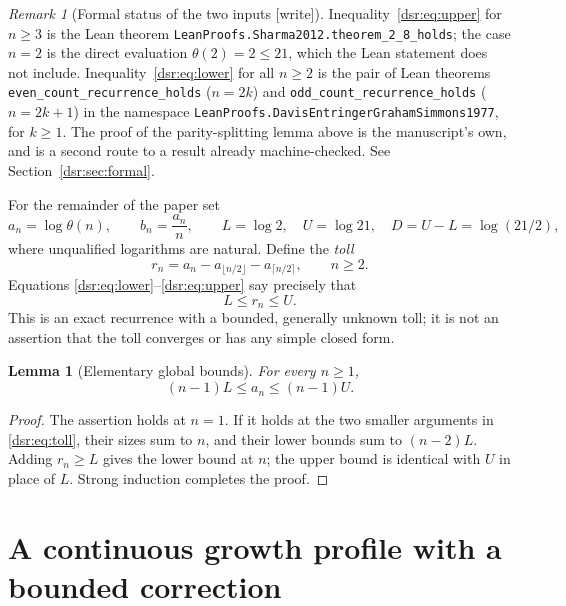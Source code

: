 \documentclass[11pt,a4paper]{article}
\numberwithin{equation}{section}
\newtheorem{lemma}[theorem]{Lemma}
\theoremstyle{definition}
\theoremstyle{remark}
\newtheorem{remark}[theorem]{Remark}
\newcommand{\wtag}{\textup{[write]}}
\newcommand{\lean}[1]{\nolinkurl{#1}}
\theoremstyle{definition}
\theoremstyle{plain}
\begin{document}
\begin{remark}[Formal status of the two inputs \wtag]
\label{dsr:rem:inputs-formal}
Inequality~\eqref{dsr:eq:upper} for $n\ge3$ is the Lean theorem
\lean{LeanProofs.Sharma2012.theorem_2_8_holds}; the case $n=2$ is the direct
evaluation $\theta(2)=2\le21$, which the Lean statement does not include.
Inequality~\eqref{dsr:eq:lower} for all $n\ge2$ is the pair of Lean theorems
\lean{even_count_recurrence_holds} ($n=2k$) and
\lean{odd_count_recurrence_holds} ($n=2k+1$) in the namespace
\lean{LeanProofs.DavisEntringerGrahamSimmons1977}, for $k\ge1$. The proof of
the parity-splitting lemma above is the manuscript's own, and is a second
route to a result already machine-checked. See
Section~\ref{dsr:sec:formal}.
\end{remark}

For the remainder of the paper set
\begin{equation}
 a_n=\log\theta(n),\qquad b_n=\frac{a_n}{n},\qquad
 L=\log2,\quad U=\log21,\quad D=U-L=\log(21/2),
\label{dsr:eq:notation}
\end{equation}
where unqualified logarithms are natural. Define the \emph{toll}
\begin{equation}
 r_n=a_n-a_{\lfloor n/2\rfloor}-a_{\lceil n/2\rceil},\qquad n\ge2.
\label{dsr:eq:toll}
\end{equation}
Equations \eqref{dsr:eq:lower}--\eqref{dsr:eq:upper} say precisely that
\begin{equation}
 L\le r_n\le U. \label{dsr:eq:bounded-toll}
\end{equation}
This is an exact recurrence with a bounded, generally unknown toll; it is not
an assertion that the toll converges or has any simple closed form.

\begin{lemma}[Elementary global bounds]
For every $n\ge1$,
\begin{equation}
 (n-1)L\le a_n\le(n-1)U.
\label{dsr:eq:rough}
\end{equation}
\end{lemma}
\begin{proof}
The assertion holds at $n=1$. If it holds at the two smaller arguments in
\eqref{dsr:eq:toll}, their sizes sum to $n$, and their lower bounds sum to
$(n-2)L$. Adding $r_n\ge L$ gives the lower bound at $n$; the upper bound is
identical with $U$ in place of $L$. Strong induction completes the proof.
\end{proof}

\section{A continuous growth profile with a bounded correction}
\label{dsr:sec:profile}
\end{document}
